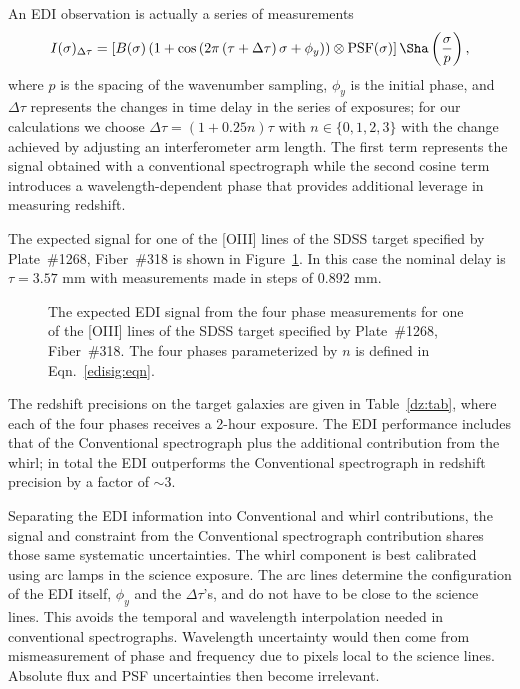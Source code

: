 \documentclass[preprint]{aastex}
\begin{document}
An EDI observation is actually a series of measurements
\begin{equation}
I(\sigma)_{\Delta\tau} = \left[B(\sigma)\left(1+\cos{\left(2\pi\left(\tau+\Delta \tau\right)\sigma+\phi_y \right)} \right)\otimes \mbox{PSF}(\sigma)\right]\Sha\left(\frac{\sigma}{p}\right),
\label{edisig:eqn}
\end{equation}
where $p$ is the spacing of the wavenumber sampling, $\phi_y$ is the initial phase,
and $\Delta \tau$ represents the changes in time delay in the series of exposures; for our calculations we choose  $\Delta \tau = (1+0.25n)\tau $ with $n\in\{0,1,2,3\}$
with the change achieved by adjusting an interferometer arm length.
The first term represents the signal obtained with a conventional spectrograph while the second cosine term
introduces a wavelength-dependent phase that provides additional leverage in measuring redshift.


The expected signal for one of the [OIII] lines of the SDSS target specified by Plate~\#1268, Fiber~\#318 is shown
in Figure~\ref{edicounts:fig}.   In this case the nominal delay is $\tau = 3.57$ mm with measurements
made in steps of 0.892 mm.

\begin{figure}[t]
   \centering
   \caption{The expected EDI signal from the four phase measurements for one of the [OIII] lines of
   the SDSS target specified by Plate~\#1268, Fiber~\#318.
   The four phases parameterized by $n$ is defined in Eqn.~\ref{edisig:eqn}.\label{edicounts:fig}}
\end{figure}


The redshift precisions on the target galaxies are given in Table~\ref{dz:tab}, where each of the four phases receives
a 2-hour exposure.  The EDI performance includes that of the Conventional spectrograph plus
the additional contribution from the whirl; in total the EDI outperforms the Conventional spectrograph
in redshift precision by a factor of $\sim 3$.

Separating the EDI information into Conventional and whirl contributions,
the signal and constraint from the Conventional spectrograph contribution shares those same systematic uncertainties.
The whirl component is best calibrated using arc lamps in the science exposure.  The arc lines determine the configuration
of the EDI itself, $\phi_y$ and the $\Delta \tau$'s, and do not have to be close
to the science lines.  This avoids the temporal and wavelength interpolation needed in conventional spectrographs.
Wavelength uncertainty would then come from mismeasurement of phase and frequency due to pixels local to the
science lines. Absolute flux and PSF uncertainties then become irrelevant.
\end{document}
